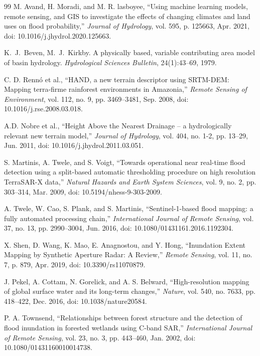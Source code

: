 \documentclass[10pt,twocolumn]{article}
\begin{document}
{\begin{thebibliography}{99}
M. Avand, H. Moradi, and M. R. lasboyee, ``Using machine learning models, remote sensing, and GIS to investigate the effects of changing climates and land uses on flood probability,'' \emph{Journal of Hydrology}, vol. 595, p. 125663, Apr. 2021, doi: 10.1016/j.jhydrol.2020.125663.

K.~J.~Beven, M.~J.~Kirkby. A physically based, variable contributing area model of basin hydrology. \emph{Hydrological Sciences Bulletin}, 24(1):43--69, 1979.

C. D. Rennó et al., ``HAND, a new terrain descriptor using SRTM-DEM: Mapping terra-firme rainforest environments in Amazonia,'' \emph{Remote Sensing of Environment}, vol. 112, no. 9, pp. 3469--3481, Sep. 2008, doi: 10.1016/j.rse.2008.03.018.

A.D. Nobre et al., ``Height Above the Nearest Drainage -- a hydrologically relevant new terrain model,'' \emph{Journal of Hydrology}, vol. 404, no. 1-2, pp. 13--29, Jun. 2011, doi: 10.1016/j.jhydrol.2011.03.051.

S. Martinis, A. Twele, and S. Voigt, ``Towards operational near real-time flood detection using a split-based automatic thresholding procedure on high resolution TerraSAR-X data,'' \emph{Natural Hazards and Earth System Sciences}, vol. 9, no. 2, pp. 303--314, Mar. 2009, doi: 10.5194/nhess-9-303-2009.

A. Twele, W. Cao, S. Plank, and S. Martinis, ``Sentinel-1-based flood mapping: a fully automated processing chain,'' \emph{International Journal of Remote Sensing}, vol. 37, no. 13, pp. 2990--3004, Jun. 2016, doi: 10.1080/01431161.2016.1192304.

X. Shen, D. Wang, K. Mao, E. Anagnostou, and Y. Hong, ``Inundation Extent Mapping by Synthetic Aperture Radar: A Review,'' \emph{Remote Sensing}, vol. 11, no. 7, p. 879, Apr. 2019, doi: 10.3390/rs11070879.

J. Pekel, A. Cottam, N. Gorelick, and A. S. Belward, ``High-resolution mapping of global surface water and its long-term changes,'' \emph{Nature}, vol. 540, no. 7633, pp. 418--422, Dec. 2016, doi: 10.1038/nature20584.

P. A. Townsend, ``Relationships between forest structure and the detection of flood inundation in forested wetlands using C-band SAR,'' \emph{International Journal of Remote Sensing}, vol. 23, no. 3, pp. 443--460, Jan. 2002, doi: 10.1080/01431160010014738.


\end{thebibliography}}
\end{document}
